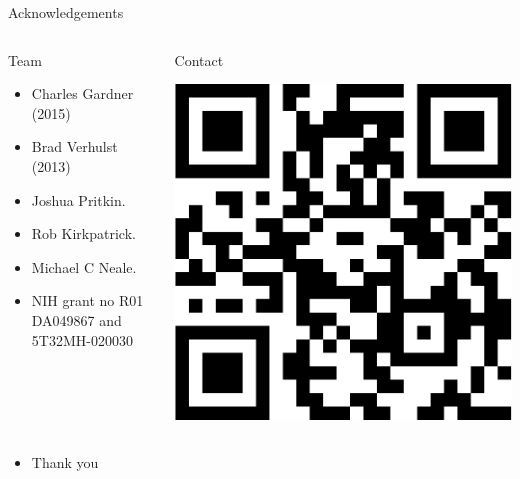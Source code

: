 \documentclass[australian,ignorenonframetext,aspectratio=169]{beamer}
\providecommand{\tightlist}{%
  \setlength{\itemsep}{0pt}\setlength{\parskip}{0pt}}
\begin{document}
\begin{frame}{Acknowledgements}
\protect\hypertarget{acknowledgements}{}

\begin{columns}[T]
\begin{column}{0.5\textwidth}
\begin{block}{Team}

\begin{itemize}
\tightlist
\item
  Charles Gardner (2015)
\item
  Brad Verhulst (2013)
\item
  Joshua Pritkin.
\item
  Rob Kirkpatrick.
\end{itemize}

\vspace{3mm}

\begin{itemize}
\item
  Michael C Neale.
\item
  NIH grant no R01 DA049867 and 5T32MH-020030
\end{itemize}

\end{block}
\end{column}

\begin{column}{0.5\textwidth}
\begin{block}{Contact}

\begin{center}\includegraphics[width=0.8\linewidth]{../graphs/qr-twitter-1} \end{center}

\end{block}
\end{column}
\end{columns}

\appendix

\end{frame}

\begin{frame}[standout]{}
\protect\hypertarget{section-2}{}

\begin{itemize}
\tightlist
\item
  Thank you
\end{itemize}

\end{frame}
\end{document}
